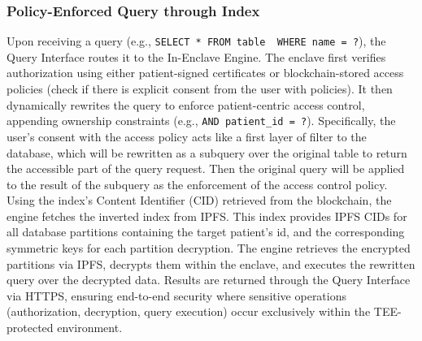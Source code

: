 \documentclass[conference]{IEEEtran}
\newcommand{\showkot}[1]{ {\color{red}{#1}}}
\newcommand{\wenyi}[1]{ {\color{blue}{#1}}}
\newcommand{\seokki}[1]{ {\color{orange}{#1}}}
\begin{document}
\subsubsection{Policy-Enforced Query through Index}
Upon receiving a query (e.g., \lstinline{SELECT * FROM table  WHERE name = ?}), the Query Interface routes it to the In-Enclave Engine. The enclave first verifies authorization using either patient-signed certificates or blockchain-stored access policies (check if there is explicit consent from the user with policies). It then dynamically rewrites the query to enforce patient-centric access control, appending ownership constraints (e.g., \lstinline{AND patient_id = ?}). 
Specifically, the user's consent with the access policy acts like a first layer of filter to the database, which will be rewritten as a subquery over the original table to return the accessible part of the query request. Then the original query will be applied to the result of the subquery as the enforcement of the access control policy.
Using the index's Content Identifier (CID) retrieved from the blockchain, the engine fetches the inverted index from IPFS. 
This index provides IPFS CIDs for all database partitions containing the target patient's id, and the corresponding symmetric keys for each partition decryption.
The engine retrieves the encrypted partitions via IPFS, decrypts them within the enclave, and executes the rewritten query over the decrypted data. 
Results are returned through the Query Interface via HTTPS, ensuring end-to-end security where sensitive operations (authorization, decryption, query execution) occur exclusively within the TEE-protected environment.

\end{document}
